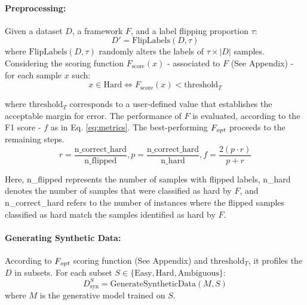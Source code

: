 \documentclass{article}
\theoremstyle{plain}
\theoremstyle{definition}
\theoremstyle{remark}
\begin{document}
\paragraph{Preprocessing:}  Given a dataset \( D \), a framework \( F \), and a label flipping proportion \( \tau \): \\[-9mm]

\begin{equation*}
D' = \text{FlipLabels}(D, \tau)
\end{equation*}
where \( \text{FlipLabels}(D, \tau) \) randomly alters the labels of \( \tau \times |D| \) samples. Considering the scoring function \( F_\text{score}(x) \) - associated to $F$ (See Appendix) -  for each sample \( x \) such:\\[-3mm]
\begin{equation*}
x \in \text{Hard} \iff F_\text{score}(x) < \text{threshold}_T
\end{equation*}

\vspace{-1mm}

where $\text{threshold}_T$ corresponds to a user-defined value that establishes the acceptable margin for error.  
 The performance of $F$ is evaluated, according to the F1 score - \(f\) as in Eq. \ref{eq:metrics}. The best-performing $F_{\emph{opt}}$  proceeds to the remaining steps. \\[-9mm]

\begin{equation}\label{eq:metrics}
    r = \frac{\text{n\_correct\_hard}}{\text{n\_flipped}},    p = \frac{\text{n\_correct\_hard}}{\text{n\_hard}},  f = \frac{2 (p \cdot r)}{p + r}
 \end{equation}

 Here, {n\_flipped} represents the number of samples with flipped labels, {n\_hard} denotes the number of samples that were classified as hard by $F$, and {n\_correct\_hard} refers to the number of instances where the flipped samples classified as hard match the samples identified as hard by $F$. 


\paragraph{Generating Synthetic Data:} According to $F_{\emph{opt}}$ scoring function (See Appendix) and $\text{threshold}_T$, it profiles the $D$ in subsets.  For each subset \( S \in \{\text{Easy}, \text{Hard}, \text{Ambiguous}\} \):
\begin{equation}
D_\text{syn}^S = \text{GenerateSyntheticData}(M, S)
\end{equation}
where \( M \) is the generative model trained on \( S \).
\end{document}
